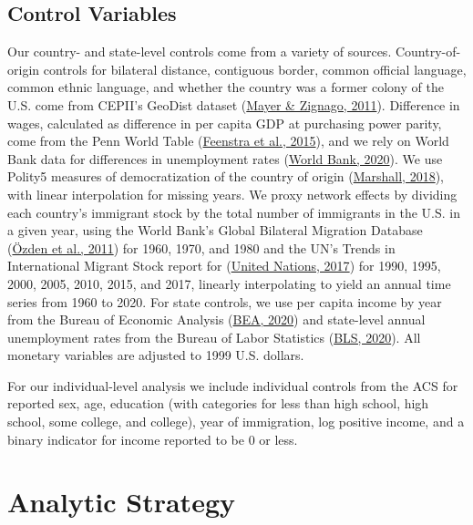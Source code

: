 \documentclass[
  11pt,
]{article}
\begin{document}
\hypertarget{control-variables}{%
\subsection{Control Variables}\label{control-variables}}

Our country- and state-level controls come from a variety of sources. Country-of-origin controls for bilateral distance, contiguous border, common official language, common ethnic language, and whether the country was a former colony of the U.S. come from CEPII's GeoDist dataset (\protect\hyperlink{ref-mayer_2011}{Mayer \& Zignago, 2011}). Difference in wages, calculated as difference in per capita GDP at purchasing power parity, come from the Penn World Table (\protect\hyperlink{ref-feenstra_2015}{Feenstra et al., 2015}), and we rely on World Bank data for differences in unemployment rates (\protect\hyperlink{ref-worldbank_2020}{World Bank, 2020}). We use Polity5 measures of democratization of the country of origin (\protect\hyperlink{ref-marshall_2018}{Marshall, 2018}), with linear interpolation for missing years. We proxy network effects by dividing each country's immigrant stock by the total number of immigrants in the U.S. in a given year, using the World Bank's Global Bilateral Migration Database (\protect\hyperlink{ref-ozden_2011}{Özden et al., 2011}) for 1960, 1970, and 1980 and the UN's Trends in International Migrant Stock report for (\protect\hyperlink{ref-unitednations_2017}{United Nations, 2017}) for 1990, 1995, 2000, 2005, 2010, 2015, and 2017, linearly interpolating to yield an annual time series from 1960 to 2020. For state controls, we use per capita income by year from the Bureau of Economic Analysis (\protect\hyperlink{ref-bea_2020}{BEA, 2020}) and state-level annual unemployment rates from the Bureau of Labor Statistics (\protect\hyperlink{ref-bls_2020}{BLS, 2020}). All monetary variables are adjusted to 1999 U.S. dollars.

For our individual-level analysis we include individual controls from the ACS for reported sex, age, education (with categories for less than high school, high school, some college, and college), year of immigration, log positive income, and a binary indicator for income reported to be 0 or less.

\hypertarget{analytic-strategy}{%
\section{Analytic Strategy}\label{analytic-strategy}}
\end{document}
